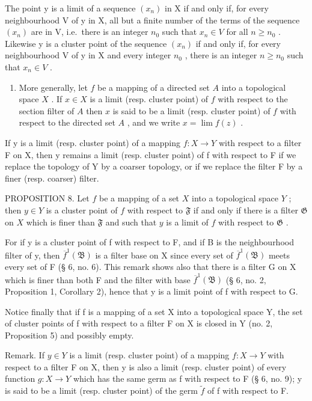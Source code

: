 The point y is a limit of a sequence \((x_{n})\) in X if and only if, for every neighbourhood V of y in X, all but a finite number of the terms of the sequence \((x_{n})\) are in V, i.e.~there is an integer \(n_{0}\) such that \(x_{n} \in V\) for all \(n \geqslant n_{0}\) . Likewise y is a cluster point of the sequence \((x_{n})\) if and only if, for every neighbourhood V of y in X and every integer \(n_{0}\) , there is an integer \(n \geqslant n_{0}\) such that \(x_{n} \in V\) .

\begin{enumerate}
\def\labelenumi{\arabic{enumi})}
\setcounter{enumi}{1}
\tightlist
\item
  More generally, let \(f\) be a mapping of a directed set \(A\) into a topological space \(X\) . If \(x \in X\) is a limit (resp. cluster point) of \(f\) with respect to the section filter of \(A\) then \(x\) is said to be a limit (resp. cluster point) of \(f\) with respect to the directed set \(A\) , and we write \(x = \lim f(z)\) .
\end{enumerate}

If y is a limit (resp. cluster point) of a mapping \(f: X \rightarrow Y\) with respect to a filter F on X, then y remains a limit (resp. cluster point) of f with respect to F if we replace the topology of Y by a coarser topology, or if we replace the filter F by a finer (resp. coarser) filter.

PROPOSITION 8. Let \(f\) be a mapping of a set \(X\) into a topological space \(Y\) ; then \(y \in Y\) is a cluster point of \(f\) with respect to \(\mathfrak{F}\) if and only if there is a filter \(\mathfrak{G}\) on \(X\) which is finer than \(\mathfrak{F}\) and such that \(y\) is a limit of \(f\) with respect to \(\mathfrak{G}\) .

For if y is a cluster point of f with respect to F, and if B is the neighbourhood filter of y, then \(\overline{f}^{1}(\mathfrak{B})\) is a filter base on X since every set of \(\overline{f}^{1}(\mathfrak{B})\) meets every set of F (§ 6, no. 6). This remark shows also that there is a filter G on X which is finer than both F and the filter with base \(\overline{f}^{1}(\mathfrak{B})\) (§ 6, no. 2, Proposition 1, Corollary 2), hence that y is a limit point of f with respect to G.

Notice finally that if f is a mapping of a set X into a topological space Y, the set of cluster points of f with respect to a filter F on X is closed in Y (no. 2, Proposition 5) and possibly empty.

Remark. If \(y \in Y\) is a limit (resp. cluster point) of a mapping \(f: X \to Y\) with respect to a filter F on X, then y is also a limit (resp. cluster point) of every function \(g: X \to Y\) which has the same germ as f with respect to F (§ 6, no. 9); y is said to be a limit (resp. cluster point) of the germ \(\tilde{f}\) of f with respect to F.

